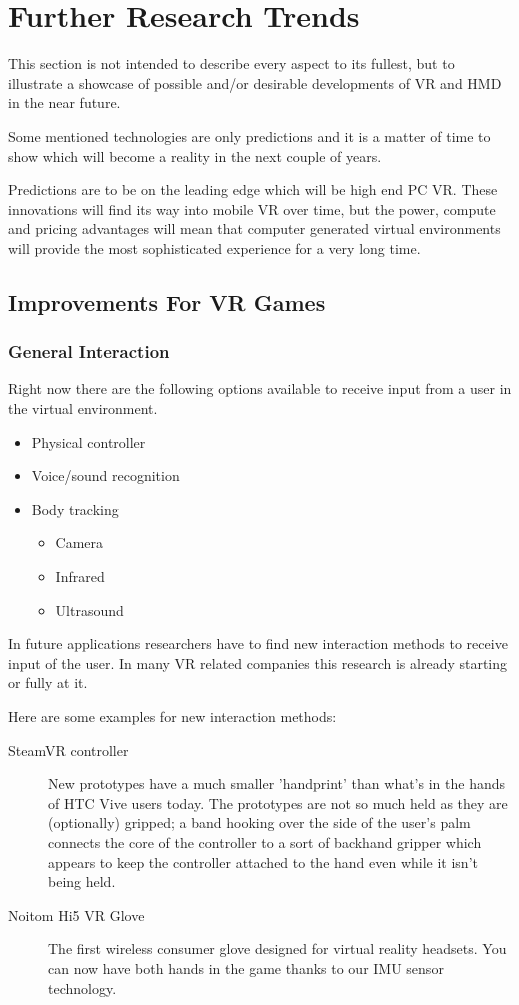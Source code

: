 \section{Further Research Trends}

This section is not intended to describe every aspect to its fullest, but to illustrate a showcase of possible and/or desirable developments of VR and HMD in the near future. 

Some mentioned technologies are only predictions and it is a matter of time to show which will become a reality in the next couple of years.

Predictions are to be on the leading edge which will be high end PC VR. These innovations will find its way into mobile VR over time, but the power, compute and pricing advantages will mean that computer generated virtual environments will provide the most sophisticated experience for a very long time.

\subsection{Improvements For VR Games}
\subsubsection{General Interaction}

Right now there are the following options available to receive input from a user in the virtual environment.
\begin{itemize}
	\item Physical controller
	\item Voice/sound recognition
	\item Body tracking
	\begin{itemize}
		\item Camera
		\item Infrared
		\item Ultrasound
	\end{itemize}
\end{itemize}

In future applications researchers have to find new interaction methods to receive input of the user. In many VR related companies this research is already starting or fully at it. 

Here are some examples for new interaction methods:

\begin{description}
	\item[SteamVR controller] New prototypes have a much smaller 'handprint' than what's in the hands of HTC Vive users today. The prototypes are not so much held as they are (optionally) gripped; a band hooking over the side of the user’s palm connects the core of the controller to a sort of backhand gripper which appears to keep the controller attached to the hand even while it isn’t being held.
	\item[Noitom Hi5 VR Glove~\textcopyright] The first wireless consumer glove designed for virtual reality headsets. You can now have both hands in the game thanks to our IMU sensor technology. 
\end{description}


